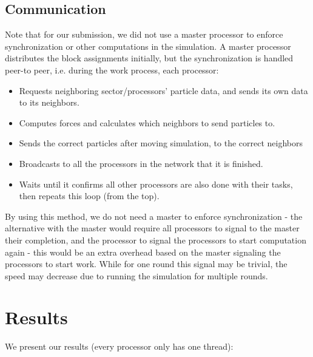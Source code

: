 \documentclass[12pt]{article}
\begin{document}
\subsection{Communication} 
Note that for our submission, we did not use a master processor to enforce synchronization or other computations in the simulation. A master processor distributes the block assignments initially, but the synchronization is handled peer-to peer, i.e. during the work process, each processor: 
\begin{itemize}
\item Requests neighboring sector/processors' particle data, and sends its own data to its neighbors. 
\item Computes forces and calculates which neighbors to send particles to. 
\item Sends the correct particles after moving simulation, to the correct neighbors
\item Broadcasts to all the processors in the network that it is finished.
\item Waits until it confirms all other processors are also done with their tasks, then repeats this loop (from the top). 
\end{itemize}
By using this method, we do not need a master to enforce synchronization - the alternative with the master would require all processors to signal to the master their completion, and the processor to signal the processors to start computation again - this would be an extra overhead based on the master signaling the processors to start work. While for one round this signal may be trivial, the speed may decrease due to running the simulation for multiple rounds. 




\section{Results}
We present our results (every processor only has one thread): 
\end{document}
